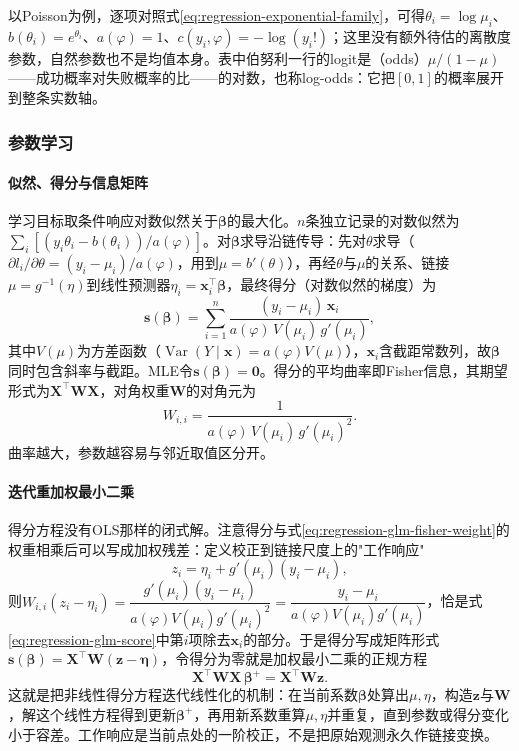 以Poisson为例，逐项对照式\eqref{eq:regression-exponential-family}，可得$\theta_i=\log\mu_i$、$b(\theta_i)=e^{\theta_i}$、$a(\varphi)=1$、$c(y_i,\varphi)=-\log(y_i!)$；这里没有额外待估的离散度参数，自然参数也不是均值本身。表中伯努利一行的logit是（odds）$\mu/(1-\mu)$——成功概率对失败概率的比——的对数，也称log-odds：它把$[0,1]$的概率展开到整条实数轴。

\subsubsection{参数学习}
\label{sec:regression-glm-learning}

\paragraph{似然、得分与信息矩阵}

学习目标取条件响应对数似然关于$\bm{\beta}$的最大化。$n$条独立记录的对数似然为$\sum_i[(y_i\theta_i-b(\theta_i))/a(\varphi)]$。对$\bm{\beta}$求导沿链传导：先对$\theta$求导（$\partial l_i/\partial\theta=(y_i-\mu_i)/a(\varphi)$，用到$\mu=b'(\theta)$），再经$\theta$与$\mu$的关系、链接$\mu=g^{-1}(\eta)$到线性预测器$\eta_i=\bm{x}_i^{\top}\bm{\beta}$，最终得分（对数似然的梯度）为
\begin{equation}
  \bm{s}(\bm{\beta})
  =\sum_{i=1}^n
    \frac{(y_i-\mu_i)\,\bm{x}_i}
         {a(\varphi)\,V(\mu_i)\,g'(\mu_i)},
  \label{eq:regression-glm-score}
\end{equation}
其中$V(\mu)$为方差函数（$\operatorname{Var}(Y\mid\bm x)=a(\varphi)V(\mu)$），$\bm{x}_i$含截距常数列，故$\bm{\beta}$同时包含斜率与截距。MLE令$\bm{s}(\bm{\beta})=\bm{0}$。得分的平均曲率即Fisher信息，其期望形式为$\bm{X}^{\top}\bm{W}\bm{X}$，对角权重$\bm{W}$的对角元为
\begin{equation}
  W_{i,i}=\frac{1}{a(\varphi)\,V(\mu_i)\,g'(\mu_i)^2}.
  \label{eq:regression-glm-fisher-weight}
\end{equation}
曲率越大，参数越容易与邻近取值区分开。

\paragraph{迭代重加权最小二乘}

得分方程没有OLS那样的闭式解。注意得分与式\eqref{eq:regression-glm-fisher-weight}的权重相乘后可以写成加权残差：定义校正到链接尺度上的"工作响应"
\begin{equation}
  z_i=\eta_i+g'(\mu_i)(y_i-\mu_i),
  \label{eq:regression-irls}
\end{equation}
则$W_{i,i}(z_i-\eta_i)=\dfrac{g'(\mu_i)(y_i-\mu_i)}{a(\varphi)V(\mu_i)g'(\mu_i)^2}=\dfrac{y_i-\mu_i}{a(\varphi)V(\mu_i)g'(\mu_i)}$，恰是式\eqref{eq:regression-glm-score}中第$i$项除去$\bm{x}_i$的部分。于是得分写成矩阵形式$\bm{s}(\bm{\beta})=\bm{X}^{\top}\bm{W}(\bm{z}-\bm{\eta})$，令得分为零就是加权最小二乘的正规方程
\[
  \bm{X}^{\top}\bm{W}\bm{X}\,\bm{\beta}^{+}=\bm{X}^{\top}\bm{W}\bm{z}.
\]
这就是把非线性得分方程迭代线性化的机制：在当前系数$\bm{\beta}$处算出$\mu,\eta$，构造$\bm{z}$与$\bm{W}$，解这个线性方程得到更新$\bm{\beta}^{+}$，再用新系数重算$\mu,\eta$并重复，直到参数或得分变化小于容差。工作响应是当前点处的一阶校正，不是把原始观测永久作链接变换。

